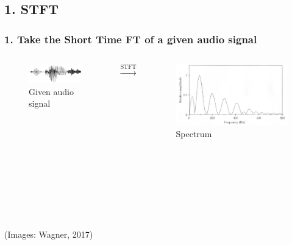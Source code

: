 \documentclass{beamer}
\begin{document}
\subsection{1. STFT}
\begin{frame}
\frametitle{1. Take the Short Time FT of a given audio signal}
\begin{columns}
\begin{figure}
\includegraphics[scale=0.25]{pngs/03_oszillo.png} 
\caption{Given audio signal}
\end{figure}
$\xrightarrow[]{\text{STFT}}$
\begin{figure}
\includegraphics[scale=0.1]{pngs/04_spektrum.png} 
\caption{Spectrum}
\end{figure}
\end{columns}
\ \\
\ \\
\ \\
\ \\
\ \\
\ \\
(Images: Wagner, 2017)
\end{frame}
\end{document}
